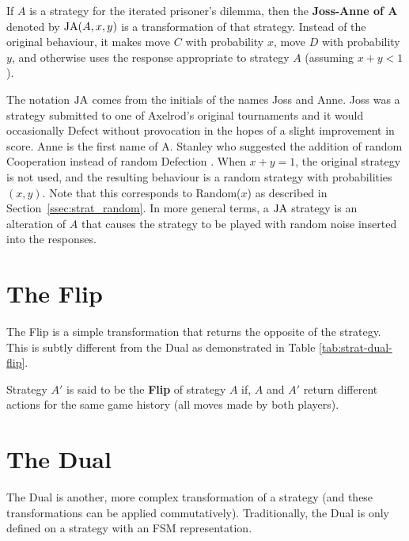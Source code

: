 \begin{definition}\label{def:joss-ann}
If $A$ is a strategy for the iterated prisoner's dilemma, then the
\textbf{Joss-Anne of A} denoted by $\text{JA}(A, x, y)$ is a transformation of that strategy.
Instead of the original behaviour, it makes move $C$ with probability $x$, move
$D$ with probability $y$, and otherwise uses the response appropriate to
strategy $A$ (assuming $x+y < 1$).
\end{definition}

The notation $\text{JA}$ comes from the initials of the names Joss and Anne.
Joss was a strategy submitted to one of Axelrod’s original tournaments and it would occasionally Defect without provocation in the hopes of a slight improvement in score.
Anne is the first name of A. Stanley who suggested the addition of random Cooperation instead of random Defection \cite{Ashlock2008}.
When $x + y = 1$, the original strategy is not used, and the resulting behaviour
is a random strategy with probabilities $(x, y)$. Note that this corresponds to
Random($x$) as described in Section~\ref{ssec:strat_random}.
In more general terms, a $\text{JA}$ strategy is an alteration of $A$ that causes the strategy to be played with random noise inserted into the responses.




\section{The Flip}\label{sec:flip}
The Flip is a simple transformation that returns the opposite of the strategy.
This is subtly different from the Dual as demonstrated in Table \ref{tab:strat-dual-flip}.

\begin{definition}\label{def:flip}
Strategy $A'$ is said to be the \textbf{Flip} of strategy $A$ if, $A$ and $A'$ return different actions for the same game history (all moves made by both players).
\end{definition}



\section{The Dual}\label{sec:dual}
The Dual is another, more complex transformation of a strategy \cite{Ashlock2008, Ashlock2010, Ashlock2004,  Ashlock2005, Ashlock2009, Ashlock2006} (and these transformations can be applied commutatively).
Traditionally, the Dual is only defined on a strategy with an FSM representation.

